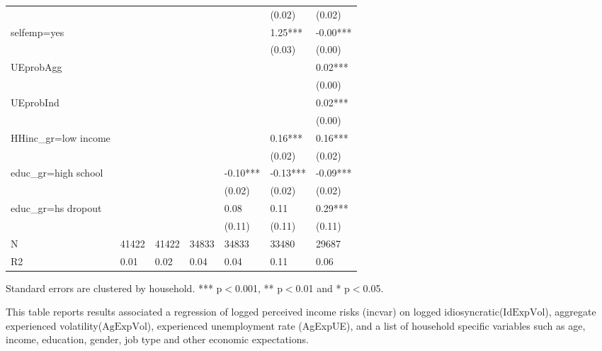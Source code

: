 \begin{table}[p]
\begin{adjustbox}{width=\textwidth}
\begin{threeparttable}
\begin{tabular}{lllllll}
                    &          &           &            &             &       (0.02) &        (0.02) \\
selfemp=yes         &          &           &            &             &      1.25*** &      -0.00*** \\
                    &          &           &            &             &       (0.03) &        (0.00) \\
UEprobAgg           &          &           &            &             &              &       0.02*** \\
                    &          &           &            &             &              &        (0.00) \\
UEprobInd           &          &           &            &             &              &       0.02*** \\
                    &          &           &            &             &              &        (0.00) \\
HHinc\_gr=low income &          &           &            &             &      0.16*** &       0.16*** \\
                    &          &           &            &             &       (0.02) &        (0.02) \\
educ\_gr=high school &          &           &            &    -0.10*** &     -0.13*** &      -0.09*** \\
                    &          &           &            &      (0.02) &       (0.02) &        (0.02) \\
educ\_gr=hs dropout  &          &           &            &        0.08 &         0.11 &       0.29*** \\
                    &          &           &            &      (0.11) &       (0.11) &        (0.11) \\
N                   &    41422 &     41422 &      34833 &       34833 &        33480 &         29687 \\
R2                  &     0.01 &      0.02 &       0.04 &        0.04 &         0.11 &          0.06 \\
\bottomrule
\end{tabular}
	\begin{flushleft}
\item Standard errors are clustered by household. *** p$<$0.001, ** p$<$0.01 and * p$<$0.05. 
\item This table reports results associated a regression of logged perceived income risks (incvar) on logged idiosyncratic($\text{IdExpVol}$), aggregate experienced volatility($\text{AgExpVol}$), experienced unemployment rate (AgExpUE), and a list of household specific variables such as age, income, education, gender, job type and other economic expectations.
\end{flushleft}
\end{threeparttable}
\end{adjustbox}
\end{table}
\clearpage

